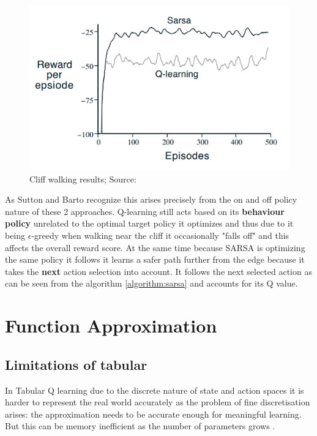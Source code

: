\begin{figure}[H]
\centering
\includegraphics[scale=0.6]{figures/cliff_score.PNG}
  \caption{Cliff walking results; Source: \cite{sutton_barto}}
  \label{fig:cliff_score}
\end{figure}

As Sutton and Barto recognize \cite{sutton_barto} this 
arises precisely from the on and off policy nature of 
these 2 approaches. Q-learning still acts based on its
\textbf{behaviour policy} unrelated to the optimal target policy it optimizes and thus due to it being $\epsilon$-greedy when walking near the cliff it occasionally "falls off" and this affects the overall
reward score.  At the same time because SARSA is 
optimizing the same policy it follows it learns a safer
path further from the edge because it takes the \textbf{next} action selection into account. 
It follows the next selected action as can be seen from the 
algorithm \ref{algorithm:sarsa} and accounts for its Q value.

\section{Function Approximation}

\subsection{Limitations of tabular}

In Tabular Q learning due to the discrete nature of 
state and action spaces it is harder to represent the real world accurately as the problem of fine discretisation arises: the approximation needs to be accurate enough for meaningful learning. But this can be memory inefficient as the number of parameters grows \cite{lecture_intro_to_deep_rl}. \\

